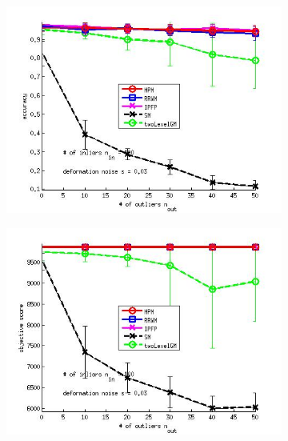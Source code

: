 \documentclass[
	fontsize=12pt,
	paper=a4,
	twoside=false,
	numbers=noenddot,
	plainheadsepline,
	toc=listof,
	toc=bibliography
]{scrartcl}
\begin{document}
\begin{figure}[h] 
	\begin{subfigure}[b]{0.3\textwidth}
		\centering
		\includegraphics[scale=0.25]{"fig_ver2608/syntheticPointSets/ver4.3.2/outliertest_n50/accuracy_avg10t"} 
	\end{subfigure}%
	\begin{subfigure}[b]{0.3\textwidth}
		\centering
		\includegraphics[scale=0.25]{"fig_ver2608/syntheticPointSets/ver4.3.2/outliertest_n50/score_avg10t"} 
	\end{subfigure} 
	\begin{subfigure}[b]{0.3\textwidth}
		\centering

\end{subfigure}
\end{figure}
\end{document}
